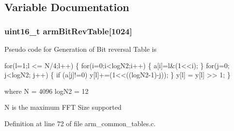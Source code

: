 \subsection{Variable Documentation}
\hypertarget{group___c_f_f_t___c_i_f_f_t_gae247e83ad50d474107254e25b36ad42b}{
\subsubsection[{arm\-Bit\-Rev\-Table}]{ {\bf uint16\-\_\-t} arm\-Bit\-Rev\-Table\mbox{[}1024\mbox{]}}}\label{group___c_f_f_t___c_i_f_f_t_gae247e83ad50d474107254e25b36ad42b}
\begin{DoxyParagraph}{}
Pseudo code for Generation of Bit reversal Table is 
\end{DoxyParagraph}
\begin{DoxyParagraph}{}

\begin{DoxyPre}for(l=1;l <= N/4;l++)    
\{    
  for(i=0;i<logN2;i++)    
  \{     
    a[i]=l\&(1<<i);    
  \}    
  for(j=0; j<logN2; j++)    
  \{    
    if (a[j]!=0)    
    y[l]+=(1<<((logN2-1)-j));    
  \}    
  y[l] = y[l] >> 1;    
 \} \end{DoxyPre}
 
\end{DoxyParagraph}
\begin{DoxyParagraph}{}
where N = 4096 log\-N2 = 12 
\end{DoxyParagraph}
\begin{DoxyParagraph}{}
N is the maximum F\-F\-T Size supported 
\end{DoxyParagraph}


Definition at line 72 of file arm\-\_\-common\-\_\-tables.\-c.

